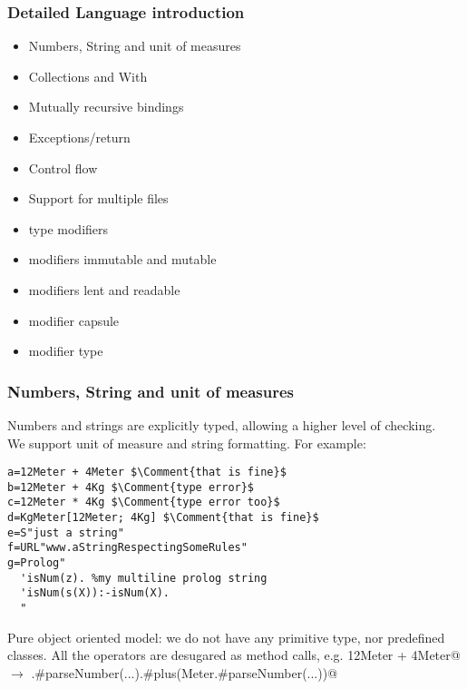 
\begin{frame}[fragile]
\frametitle{Detailed Language introduction}
\begin{itemize}
\item Numbers, String and unit of measures
\item Collections and With
\item Mutually recursive bindings
\item Exceptions/return
\item Control flow
\item Support for multiple files
\item type modifiers
\item modifiers immutable and mutable
\item modifiers lent and readable
\item modifier capsule
\item modifier type
\end{itemize}
\end{frame}


\begin{frame}[fragile]
\frametitle{Numbers, String and unit of measures}
Numbers and strings are explicitly typed, allowing a higher level of checking.
\\
We support unit of measure and string formatting.
 For example:
\begin{NiceCode}{59ex}{0.8}
\begin{lstlisting}
a=12Meter + 4Meter $\Comment{that is fine}$
b=12Meter + 4Kg $\Comment{type error}$
c=12Meter * 4Kg $\Comment{type error too}$
d=KgMeter[12Meter; 4Kg] $\Comment{that is fine}$
e=S"just a string"
f=URL"www.aStringRespectingSomeRules"
g=Prolog"
  'isNum(z). %my multiline prolog string
  'isNum(s(X)):-isNum(X).
  "
\end{lstlisting}
\end{NiceCode}
Pure object oriented model: we do not have any primitive type, nor predefined classes.
All the operators are desugared as method calls,  e.g. \Q@12Meter + 4Meter@ $\rightarrow$ 
\Q@Meter.#parseNumber(...).#plus(Meter.#parseNumber(...))@
\end{frame}


